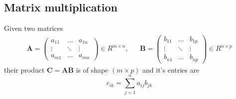 \subsection{Matrix multiplication}
Given two matrices 
\begin{align}
    \bm{A} = 
    \begin{pmatrix}
        a_{11} & \hdots & a_{1n} \\ 
        \vdots & \ddots & \vdots \\
        a_{m1} & \hdots & a_{mn}
    \end{pmatrix} \in R^{m \times n}, &&
    \bm{B} = 
    \begin{pmatrix}
        b_{11} & \hdots & b_{1p} \\ 
        \vdots & \ddots & \vdots \\
        b_{n1} & \hdots & b_{np}
    \end{pmatrix} \in R^{n \times p}
\end{align}
their product $\bm{C} = \bm{A}\bm{B}$ is of shape $(m \times p)$ and it's entries are
\begin{equation}
    c_{ik} = \sum_{j=1}^n a_{ij} b_{jk}
\end{equation}
